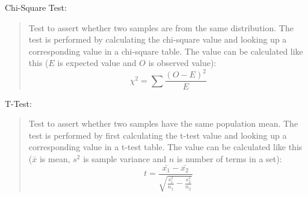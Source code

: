 \begin{framed}
  \hypertarget{metric:chi}{Chi-Square Test:}
  \begin{quote}
    Test to assert whether two samples are from the same distribution. The test is performed by calculating the chi-square value and looking up a corresponding value in a chi-square table. The value can be calculated like this ($E$ is expected value and $O$ is observed value):
    $$\chi^2 = \sum\frac{(O - E)^2}{E}$$
  \end{quote}

  \hypertarget{metric:tt}{T-Test:}
  \begin{quote}
    Test to assert whether two samples have the same population mean. The test is performed by first calculating the t-test value and looking up a corresponding value in a t-test table. The value can be calculated like this ($\bar{x}$ is mean, $s^2$ is sample variance and $n$ is number of terms in a set):
    $$t = \frac{\bar{x_1} - \bar{x_2}}{\sqrt{\frac{s_1^2}{n_1} - \frac{s_2^2}{n_2}}}$$
  \end{quote}
\end{framed}

